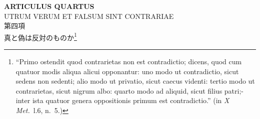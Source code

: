 \documentclass[paper=a4paper,fontsize=10pt,jafontsize=9pt,titlepage]{jlreq}
\begin{document}
{}
\setcounter{section}{4}
\setcounter{subsection}{0}
\begin{center}
 {\Large {\bfseries ARTICULUS QUARTUS}}\\
 {\large UTRUM VERUM ET FALSUM SINT CONTRARIAE}\\

 {\Large 第四項\\真と偽は反対のものか}\footnote { ``Primo ostendit quod
contrarietas non est contradictio; dicens, quod cum quatuor modis
aliqua alicui opponantur: uno modo ut contradictio, sicut sedens non
sedenti; alio modo ut privatio, sicut caecus videnti: tertio modo ut
contrarietas, sicut nigrum albo: quarto modo ad aliquid, sicut filius
patri;- inter ista quatuor genera oppositionis primum est
contradictio.'' (in {\itshape X Met.}~l.6, n.~5.)  }
\end{center}
\end{document}
